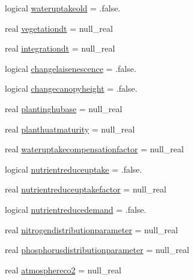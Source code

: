 \begin{DoxyCompactItemize}
logical \mbox{\hyperlink{structmodulevegetation_1_1t__computeoptions_aa7daa07d18109b8a3a72c6202a158f83}{wateruptakeold}} = .false.
\item 
real \mbox{\hyperlink{structmodulevegetation_1_1t__computeoptions_a784988550b0dd26dc314151e9fc4d424}{vegetationdt}} = null\+\_\+real
\item 
real \mbox{\hyperlink{structmodulevegetation_1_1t__computeoptions_adacf79e81b8fcb556902d82e8cfc84b1}{integrationdt}} = null\+\_\+real
\item 
logical \mbox{\hyperlink{structmodulevegetation_1_1t__computeoptions_a6ba8faf8950f2f5efda66eb865b10e11}{changelaisenescence}} = .false.
\item 
logical \mbox{\hyperlink{structmodulevegetation_1_1t__computeoptions_a34625bf7cc4f98f4b9189f61ec75c738}{changecanopyheight}} = .false.
\item 
real \mbox{\hyperlink{structmodulevegetation_1_1t__computeoptions_a6c1199a67ee7b2ab792ebe1a49ae08c0}{plantinghubase}} = null\+\_\+real
\item 
real \mbox{\hyperlink{structmodulevegetation_1_1t__computeoptions_a98af3d8ff6c023d87e82baf851e183d5}{planthuatmaturity}} = null\+\_\+real
\item 
real \mbox{\hyperlink{structmodulevegetation_1_1t__computeoptions_a8d0bcdd028a309f9923aa2703ff58e28}{wateruptakecompensationfactor}} = null\+\_\+real
\item 
logical \mbox{\hyperlink{structmodulevegetation_1_1t__computeoptions_a05dfa8b7f22717a8bee9ebe1dbb8dd25}{nutrientreduceuptake}} = .false.
\item 
real \mbox{\hyperlink{structmodulevegetation_1_1t__computeoptions_a5d9ec044729aa5f960fb562c0fadcfcf}{nutrientreduceuptakefactor}} = null\+\_\+real
\item 
logical \mbox{\hyperlink{structmodulevegetation_1_1t__computeoptions_a33b5913c4bbe90bfc6f00ee6deebe617}{nutrientreducedemand}} = .false.
\item 
real \mbox{\hyperlink{structmodulevegetation_1_1t__computeoptions_ac09ce58876462abcd5c1d14e89004b4a}{nitrogendistributionparameter}} = null\+\_\+real
\item 
real \mbox{\hyperlink{structmodulevegetation_1_1t__computeoptions_ae7c87d173d62d5d164b09c9809dc69f0}{phosphorusdistributionparameter}} = null\+\_\+real
\item 
real \mbox{\hyperlink{structmodulevegetation_1_1t__computeoptions_a42473146badc5d4b7aa7784ad4b752d6}{atmosphereco2}} = null\+\_\+real
\item 

\end{DoxyCompactItemize}
